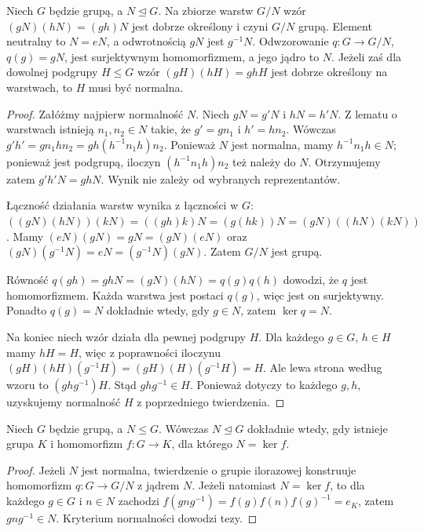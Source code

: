 \begin{twierdzenie}
\label{aa:tw:iloraz}
Niech $G$ będzie grupą, a $N\trianglelefteq G$.
Na zbiorze warstw $G/N$ wzór
$(gN)(hN)=(gh)N$ jest dobrze określony i czyni $G/N$
grupą. Element neutralny to $N=eN$,
a odwrotnością $gN$ jest $g^{-1}N$.
Odwzorowanie $q:G\to G/N$, $q(g)=gN$, jest surjektywnym
homomorfizmem, a jego jądro to $N$.
Jeżeli zaś dla dowolnej podgrupy $H\le G$ wzór
$(gH)(hH)=ghH$ jest dobrze określony na warstwach,
to $H$ musi być normalna.
\end{twierdzenie}
\begin{proof}
Załóżmy najpierw normalność $N$.
Niech $gN=g'N$ i $hN=h'N$.
Z lematu o warstwach istnieją $n_1,n_2\in N$ takie,
że $g'=gn_1$ i $h'=hn_2$. Wówczas
$g'h'=gn_1hn_2=gh(h^{-1}n_1h)n_2$.
Ponieważ $N$ jest normalna, mamy $h^{-1}n_1h\in N$;
ponieważ jest podgrupą, iloczyn $(h^{-1}n_1h)n_2$ też należy do $N$.
Otrzymujemy zatem $g'h'N=ghN$.
Wynik nie zależy od wybranych reprezentantów.

Łączność działania warstw wynika z łączności w $G$:
$((gN)(hN))(kN)=((gh)k)N=(g(hk))N=(gN)((hN)(kN))$.
Mamy $(eN)(gN)=gN=(gN)(eN)$ oraz
$(gN)(g^{-1}N)=eN=(g^{-1}N)(gN)$.
Zatem $G/N$ jest grupą.

Równość $q(gh)=ghN=(gN)(hN)=q(g)q(h)$
dowodzi, że $q$ jest homomorfizmem. Każda warstwa
jest postaci $q(g)$, więc jest on surjektywny.
Ponadto $q(g)=N$ dokładnie wtedy, gdy $g\in N$,
zatem $\ker q=N$.

Na koniec niech wzór działa dla pewnej podgrupy $H$.
Dla każdego $g\in G$, $h\in H$ mamy $hH=H$,
więc z poprawności iloczynu
$(gH)(hH)(g^{-1}H)=(gH)(H)(g^{-1}H)=H$.
Ale lewa strona według wzoru to $(ghg^{-1})H$.
Stąd $ghg^{-1}\in H$. Ponieważ dotyczy to każdego $g,h$,
uzyskujemy normalność $H$ z poprzedniego twierdzenia.
\end{proof}

\begin{wniosek}
\label{aa:wn:normalna-jadro}
Niech $G$ będzie grupą, a $N\le G$. Wówczas $N\trianglelefteq G$
dokładnie wtedy, gdy istnieje grupa $K$ i homomorfizm
$f:G\to K$, dla którego $N=\ker f$.
\end{wniosek}
\begin{proof}
Jeżeli $N$ jest normalna, twierdzenie o grupie ilorazowej
konstruuje homomorfizm $q:G\to G/N$ z jądrem $N$.
Jeżeli natomiast $N=\ker f$, to dla każdego $g\in G$
i $n\in N$ zachodzi
$f(gng^{-1})=f(g)f(n)f(g)^{-1}=e_K$,
zatem $gng^{-1}\in N$. Kryterium normalności dowodzi tezy.
\end{proof}

